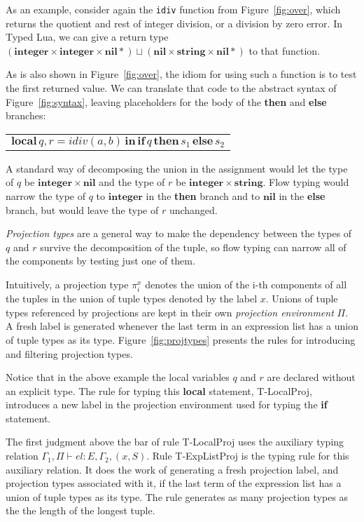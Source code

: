 \documentclass[10pt]{sigplanconf}
\newcommand{\Nil}{\mathbf{nil}}
\newcommand{\Integer}{\mathbf{integer}}
\newcommand{\String}{\mathbf{string}}
\newcommand{\env}{\Gamma}
\newcommand{\penv}{\Pi}
\begin{document}
As an example, consider again the {\tt idiv} function
from Figure~\ref{fig:over}, which returns the quotient and rest of integer division, or a division by zero error. In Typed Lua, we can give a return type $(\Integer \times \Integer \times \Nil*) \sqcup (\Nil \times \String \times \Nil{*})$ to that function. 

As is also shown in Figure~\ref{fig:over}, the idiom for using such
a function is to test the first returned value. We
can translate that code to the abstract syntax of
Figure~\ref{fig:syntax}, leaving placeholders for
the body of the {\bf then} and {\bf else} branches:
{\small
\begin{center}
	\begin{tabular}{ll}
		\multicolumn{2}{l}{$\mathbf{local} \, q, r = idiv(a, b) \, \mathbf{in} \, \mathbf{if} \, q \, \mathbf{then} \, s_1 \, \mathbf{else} \, s_2$}
	\end{tabular}
\end{center}
}

A standard way of decomposing the union in the assignment
would let the type of $q$ be $\Integer \times \Nil$ and
the type of $r$ be $\Integer \times \String$. Flow typing
would narrow the type of $q$ to $\Integer$ in the {\bf then}
branch and to $\Nil$ in the {\bf else} branch, but would
leave the type of $r$ unchanged.

{\em Projection types}
are a general way to make the dependency between the types
of $q$ and $r$ survive the decomposition of the tuple,
so flow typing can narrow all of the components by testing
just one of them.

Intuitively, a projection type $\pi_{i}^{x}$ denotes the union of
the i-th components of all the tuples in the union of tuple types
denoted by the label $x$. Unions of tuple types referenced by projections are kept in their own {\em projection environment} $\Pi$. A fresh label is generated whenever the last term
in an expression list has a union of tuple types as its type.
Figure~\ref{fig:projtypes} presents the rules for introducing and filtering projection types.

Notice that in the above example the local variables $q$ and $r$ are declared without an explicit type. 
 The rule for typing this {\bf local} statement,
{\sc T-LocalProj}, introduces a new label in the projection
environment used for typing the {\bf if} statement.

The first judgment above the bar of rule {\sc T-LocalProj} uses the auxiliary typing relation $\env_{1}, \penv \vdash el : E, \env_{2}, (x,S)$. Rule {\sc T-ExpListProj} is the typing rule for this auxiliary
relation. It does the work of generating a fresh projection label,
and projection types associated with it, if the last term of
the expression list has a union of tuple types as its type.
The rule generates as many projection types as the the length
of the longest tuple.
\end{document}
